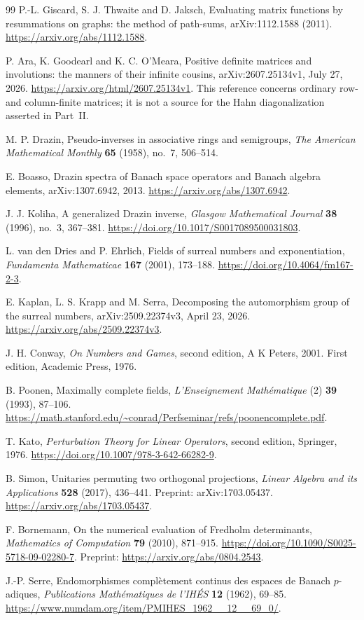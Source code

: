 \documentclass[11pt,a4paper]{article}
\numberwithin{equation}{section}
\theoremstyle{definition}
\theoremstyle{remark}
\begin{document}
\begin{thebibliography}{99}
P.-L. Giscard, S. J. Thwaite and D. Jaksch,
Evaluating matrix functions by resummations on graphs:
the method of path-sums, arXiv:1112.1588 (2011).
\url{https://arxiv.org/abs/1112.1588}.

P. Ara, K. Goodearl and K. C. O'Meara,
Positive definite matrices and involutions: the manners of their infinite
cousins, arXiv:2607.25134v1, July 27, 2026.
\url{https://arxiv.org/html/2607.25134v1}.
This reference concerns ordinary row- and column-finite matrices; it is
not a source for the Hahn diagonalization asserted in Part~II.

M. P. Drazin, Pseudo-inverses in associative rings and semigroups,
\emph{The American Mathematical Monthly} \textbf{65} (1958), no.~7,
506--514.

E. Boasso, Drazin spectra of Banach space operators and Banach algebra
elements, arXiv:1307.6942, 2013.
\url{https://arxiv.org/abs/1307.6942}.

J. J. Koliha, A generalized Drazin inverse,
\emph{Glasgow Mathematical Journal} \textbf{38} (1996), no.~3,
367--381. \url{https://doi.org/10.1017/S0017089500031803}.

L. van den Dries and P. Ehrlich, Fields of surreal numbers and
exponentiation, \emph{Fundamenta Mathematicae} \textbf{167} (2001),
173--188. \url{https://doi.org/10.4064/fm167-2-3}.

E. Kaplan, L. S. Krapp and M. Serra, Decomposing the automorphism group
of the surreal numbers, arXiv:2509.22374v3, April 23, 2026.
\url{https://arxiv.org/abs/2509.22374v3}.

J. H. Conway, \emph{On Numbers and Games}, second edition,
A K Peters, 2001. First edition, Academic Press, 1976.

B. Poonen, Maximally complete fields,
\emph{L'Enseignement Math\'ematique} (2) \textbf{39} (1993), 87--106.
\url{https://math.stanford.edu/~conrad/Perfseminar/refs/poonencomplete.pdf}.

T. Kato, \emph{Perturbation Theory for Linear Operators},
second edition, Springer, 1976.
\url{https://doi.org/10.1007/978-3-642-66282-9}.

B. Simon, Unitaries permuting two orthogonal projections,
\emph{Linear Algebra and its Applications} \textbf{528} (2017),
436--441. Preprint: arXiv:1703.05437.
\url{https://arxiv.org/abs/1703.05437}.

F. Bornemann, On the numerical evaluation of Fredholm determinants,
\emph{Mathematics of Computation} \textbf{79} (2010), 871--915.
\url{https://doi.org/10.1090/S0025-5718-09-02280-7}.
Preprint: \url{https://arxiv.org/abs/0804.2543}.

J.-P. Serre, Endomorphismes compl\`etement continus des espaces de Banach
$p$-adiques, \emph{Publications Math\'ematiques de l'IH\'ES}
\textbf{12} (1962), 69--85.
\url{https://www.numdam.org/item/PMIHES_1962__12__69_0/}.
\end{thebibliography}
\end{document}
